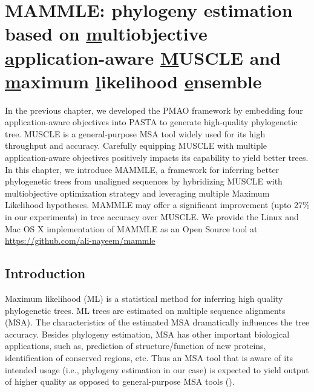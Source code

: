 
\graphicspath{{mammle/}}

\chapter{MAMMLE: phylogeny estimation based on \underline{m}ultiobjective \underline{a}pplication-aware \underline{M}USCLE and \underline{m}aximum \underline{l}ikelihood \underline{e}nsemble} \label{ch:mammle}


In the previous chapter, we developed the PMAO framework by embedding four application-aware objectives into PASTA to generate high-quality phylogenetic tree.
MUSCLE is a general-purpose MSA tool widely used for its high throughput and accuracy. Carefully equipping MUSCLE with multiple application-aware objectives positively impacts its capability to yield better trees. In this chapter, we introduce MAMMLE, a framework for inferring better phylogenetic trees from unaligned sequences by hybridizing MUSCLE with multiobjective optimization strategy and leveraging multiple Maximum Likelihood hypotheses. MAMMLE may offer a significant improvement (upto 27\% in our experiments) in tree accuracy over MUSCLE.
We provide the Linux and Mac OS X implementation of MAMMLE as an Open Source tool at \url{https://github.com/ali-nayeem/mammle}

\section{Introduction}
Maximum likelihood (ML) is a statistical method for inferring high quality phylogenetic trees. ML trees are estimated on multiple sequence alignments (MSA). The characteristics of the estimated MSA dramatically influences the tree accuracy. Besides phylogeny estimation, MSA has other important biological applications, such as, prediction of structure/function of new proteins, identification of conserved regions, etc. Thus an MSA tool that is aware of its intended usage (i.e., phylogeny estimation in our case) is expected to yield output of higher quality as opposed to general-purpose MSA tools (\cite{nayeem2020multiobjective}).  


